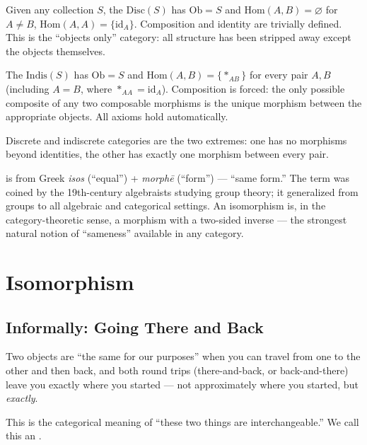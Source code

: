 Given any collection $S$, the  $\mathrm{Disc}(S)$
has $\mathrm{Ob} = S$ and $\mathrm{Hom}(A,B) = \varnothing$ for $A \neq B$,
$\mathrm{Hom}(A,A) = \{\mathrm{id}_A\}$. Composition and identity are
trivially defined. This is the ``objects only'' category: all structure has
been stripped away except the objects themselves.

The  $\mathrm{Indis}(S)$ has $\mathrm{Ob} = S$
and $\mathrm{Hom}(A,B) = \{*_{AB}\}$ for every pair $A, B$ (including
$A = B$, where $*_{AA} = \mathrm{id}_A$). Composition is forced: the only
possible composite of any two composable morphisms is the unique morphism
between the appropriate objects. All axioms hold automatically.

Discrete and indiscrete categories are the two extremes: one has no
morphisms beyond identities, the other has exactly one morphism between
every pair.


\begin{nameorigin}
 is from Greek \emph{isos} (``equal'') + \emph{morphē}
(``form'') — ``same form.'' The term was coined by the 19th-century
algebraists studying group theory; it generalized from groups to all
algebraic and categorical settings. An isomorphism is, in the category-theoretic
sense, a morphism with a two-sided inverse — the strongest natural notion of
``sameness'' available in any category.
\end{nameorigin}

\section{Isomorphism}
\label{sec:isomorphism}

\subsection{Informally: Going There and Back}

Two objects are ``the same for our purposes'' when you can travel from
one to the other and then back, and both round trips (there-and-back, or
back-and-there) leave you exactly where you started --- not approximately
where you started, but \emph{exactly}.

This is the categorical meaning of ``these two things are interchangeable.''
We call this an .

